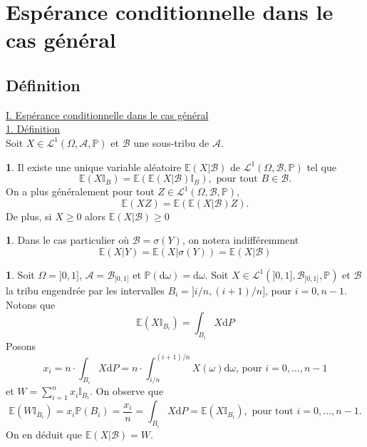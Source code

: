 \documentclass[8pt,notheorems]{beamer}
\def \E{\mathbb E}
\renewcommand{\Pr}{\mathbb{P}}
\theoremstyle{definition}
\newtheorem{definition}{\translate{Definition}}
\theoremstyle{example}
\newtheorem{example}{\translate{Exemple}}
\newtheorem{remark}{\translate{Remarque}}
\theoremstyle{mystyle}
\theoremstyle{plain}
\begin{document}
\section{Espérance conditionnelle dans le cas général}
\subsection{Définition}
\begin{frame}[allowframebreaks]
\underline{I. Espérance conditionnelle dans le cas général}\\
\underline{1. Définition}\\
Soit $X\in\mathcal{L}^1(\Omega,\mathcal{A},\Pr)$ et $\mathcal{B}$ une sous-tribu de $\mathcal{A}$.
\begin{definition}
Il existe une unique variable aléatoire $\E(X|\mathcal{B})$ de $\mathcal{L}^1(\Omega,\mathcal{B},\Pr)$ tel que  
$$
\E( X\mathbb{I}_B)=\E( \E(X|\mathcal{B}) \mathbb{I}_B),\text{ pour tout }B\in\mathcal{B}.
$$
On a plus généralement pour tout $Z\in\mathcal{L}^1(\Omega,\mathcal{B},\Pr)$,
$$
\E( XZ)=\E( \E(X|\mathcal{B}) Z).
$$
De plus, si $X\geq 0$ alors $\E(X|\mathcal{B})\geq 0$
\end{definition}
\begin{remark}
Dans le cas particulier où $\mathcal{B} = \sigma(Y)$, on notera indifféremment 
$$
\E(X|Y) = \E(X|\sigma(Y)) = \E(X|\mathcal{B})  
$$
\end{remark}
\begin{example}
Soit $\Omega = ]0,1]$, $\mathcal{A} = \mathcal{B}_{]0,1]}$ et $\Pr(\text{d}\omega) = \text{d}\omega$. Soit $X\in\mathcal{L}^1(]0,1], \mathcal{B}_{]0,1]},\Pr)$ et $\mathcal{B}$ la tribu engendrée par les intervalles $B_i = ]i/n,(i+1)/n]$, pour $i = 0, n-1$.
Notons que 
$$
\E(X\mathbb{I}_{B_i})=\int_{B_i}X\text{d}P
$$
Posons 
$$
x_i  = n\cdot \int_{B_i}X\text{d}P=n\cdot \int_{i/n}^{(i+1)/n}X(\omega)\text{d}\omega\text{, pour }i=0,\ldots, n-1
$$ 
et $W = \sum_{i=1}^n x_i\mathbb{I}_{B_i}$. On observe que
$$
\E(W\mathbb{I}_{B_i}) = x_i\Pr(B_i) = \frac{x_i}{n} = \int_{B_i}X\text{d}P = \E(X\mathbb{I}_{B_i}),\text{ pour tout }i = 0,\ldots, n-1.
$$ 
On en déduit que $\E(X|\mathcal{B}) = W$.
\end{example}
\end{frame}
\end{document}
